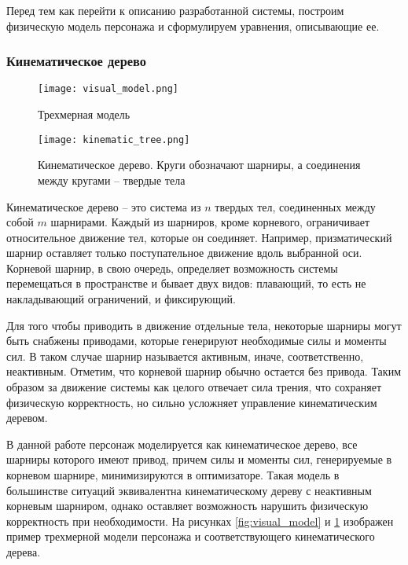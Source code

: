 Перед тем как перейти к описанию разработанной системы, построим физическую модель персонажа и сформулируем уравнения, описывающие ее.

\subsubsection{Кинематическое дерево}

\begin{figure}
  \begin{minipage}[t]{0.475\textwidth}
    \centering
    \texttt{[image: visual\_model.png]}
    \caption{Трехмерная модель}
    \label{fig:visual_model}
  \end{minipage}
\hfill
  \begin{minipage}[t]{0.475\textwidth}
    \centering
    \texttt{[image: kinematic\_tree.png]}
    \caption{Кинематическое дерево. Круги обозначают шарниры, а соединения между кругами -- твердые тела}
    \label{fig:kinematic_tree}
  \end{minipage}
\end{figure}

Кинематическое дерево -- это система из $n$ твердых тел, соединенных между собой $m$ шарнирами. Каждый из шарниров, кроме корневого, ограничивает относительное движение тел, которые он соединяет. Например, призматический шарнир оставляет только поступательное движение вдоль выбранной оси. Корневой шарнир, в свою очередь, определяет возможность системы перемещаться в пространстве и бывает двух видов: плавающий, то есть не накладывающий ограничений, и фиксирующий.

Для того чтобы приводить в движение отдельные тела, некоторые шарниры могут быть снабжены приводами, которые генерируют необходимые силы и моменты сил. В таком случае шарнир называется активным, иначе, соответственно, неактивным. Отметим, что корневой шарнир обычно остается без привода. Таким образом за движение системы как целого отвечает сила трения, что сохраняет физическую корректность, но сильно усложняет управление кинематическим деревом.

В данной работе персонаж моделируется как кинематическое дерево, все шарниры которого имеют привод, причем силы и моменты сил, генерируемые в корневом шарнире, минимизируются в оптимизаторе. Такая модель в большинстве ситуаций эквивалентна кинематическому дереву с неактивным корневым шарниром, однако оставляет возможность нарушить физическую корректность при необходимости. На рисунках \ref{fig:visual_model} и \ref{fig:kinematic_tree} изображен пример трехмерной модели персонажа и соответствующего кинематического дерева.

